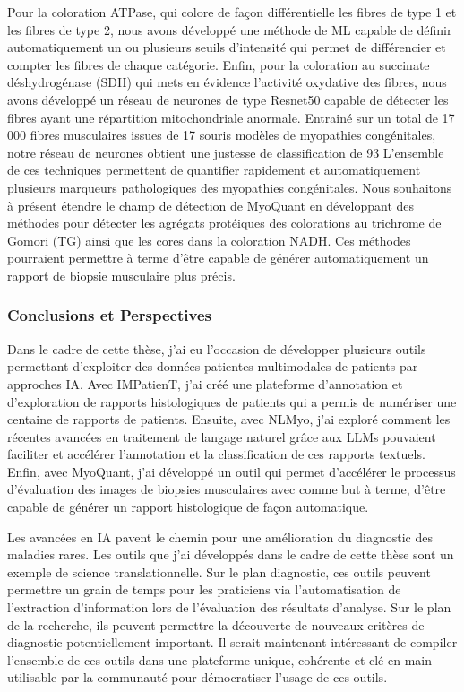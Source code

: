 Pour la coloration ATPase, qui colore de façon différentielle les fibres de type 1 et les fibres de type 2, nous avons développé une méthode de ML capable de définir automatiquement un ou plusieurs seuils d’intensité qui permet de différencier et compter les fibres de chaque catégorie.
Enfin, pour la coloration au succinate déshydrogénase (SDH) qui mets en évidence l’activité oxydative des fibres, nous avons développé un réseau de neurones de type Resnet50 capable de détecter les fibres ayant une répartition mitochondriale anormale. Entrainé sur un total de 17 000 fibres musculaires issues de 17 souris modèles de myopathies congénitales, notre réseau de neurones obtient une justesse de classification de 93 %
L’ensemble de ces techniques permettent de quantifier rapidement et automatiquement plusieurs marqueurs pathologiques des myopathies congénitales. Nous souhaitons à présent étendre le champ de détection de MyoQuant en développant des méthodes pour détecter les agrégats protéiques des colorations au trichrome de Gomori (TG) ainsi que les cores  dans la coloration NADH. Ces méthodes pourraient permettre à terme d’être capable de générer automatiquement un rapport de biopsie musculaire plus précis. 

\subsubsection{Conclusions et Perspectives}
Dans le cadre de cette thèse, j’ai eu l’occasion de développer plusieurs outils permettant d’exploiter des données patientes multimodales de patients par approches IA. Avec IMPatienT, j’ai créé une plateforme d’annotation et d’exploration de rapports histologiques de patients qui a permis de numériser une centaine de rapports de patients. Ensuite, avec NLMyo, j’ai exploré comment les récentes avancées en traitement de langage naturel grâce aux LLMs pouvaient faciliter et accélérer l’annotation et la classification de ces rapports textuels. Enfin, avec MyoQuant, j’ai développé un outil qui permet d’accélérer le processus d’évaluation des images de biopsies musculaires avec comme but à terme, d’être capable de générer un rapport histologique de façon automatique.

Les avancées en IA pavent le chemin pour une amélioration du diagnostic des maladies rares. Les outils que j’ai développés dans le cadre de cette thèse sont un exemple de science translationnelle. Sur le plan diagnostic, ces outils peuvent permettre un grain de temps pour les praticiens via l’automatisation de l’extraction d’information lors de l’évaluation des résultats d’analyse. Sur le plan de la recherche, ils peuvent permettre la découverte de nouveaux critères de diagnostic potentiellement important. Il serait maintenant intéressant de compiler l’ensemble de ces outils dans une plateforme unique, cohérente et clé en main utilisable par la communauté pour démocratiser l’usage de ces outils.
